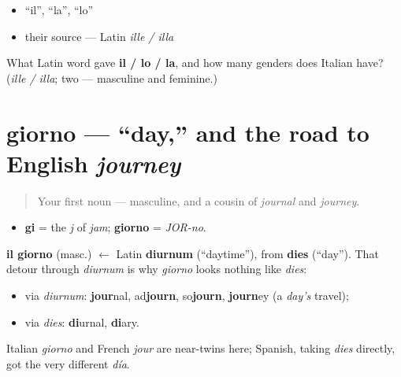 \begin{itemize}
\raggedright
  \item \textquotedblleft{}il\textquotedblright{}, \textquotedblleft{}la\textquotedblright{}, \textquotedblleft{}lo\textquotedblright{}
  \item their source — Latin \emph{ille / illa}
\end{itemize}

\begin{tcolorbox}[breakable,colback=teal!4,colframe=teal!35!black,title={Before you move on}]
What Latin word gave \textbf{il / lo / la}, and how many genders does Italian have? (\emph{ille / illa}; two — masculine and feminine.)
\end{tcolorbox}
\section[giorno]{giorno — \textquotedblleft{}day,\textquotedblright{} and the road to English \emph{journey}}

\label{lesson:IT-C01-giorno}



\begin{quote}
Your first noun — masculine, and a cousin of \emph{journal} and \emph{journey}.
\end{quote}

\begin{sounds}
\begin{itemize}
\raggedright
  \item \textbf{gi} = the \emph{j} of \emph{jam}; \textbf{giorno} = \emph{JOR-no}.
\end{itemize}
\end{sounds}

\begin{cousinweb}
\textbf{il giorno} (masc.) $\leftarrow$ Latin \textbf{diurnum} (\textquotedblleft{}daytime\textquotedblright{}), from \textbf{dies} (\textquotedblleft{}day\textquotedblright{}). That detour through \emph{diurnum} is why \emph{giorno} looks nothing like \emph{dies}:

\begin{itemize}
\raggedright
  \item via \emph{diurnum}: \textbf{jour}nal, ad\textbf{journ}, so\textbf{journ}, \textbf{journ}ey (a \emph{day's} travel);
  \item via \emph{dies}: \textbf{di}urnal, \textbf{di}ary.
\end{itemize}

Italian \emph{giorno} and French \emph{jour} are near-twins here; Spanish, taking \emph{dies} directly, got the very different \emph{día}.
\end{cousinweb}

